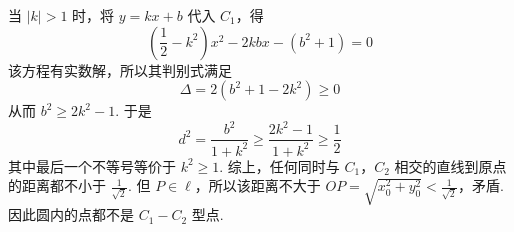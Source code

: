 \begin{problem}
\begin{solution}
\begin{enumerate}
当 \(|k|>1\) 时，将 \(y=kx+b\) 代入 \(C_1\)，得
\[
\left(\frac{1}{2}-k^2\right)x^2-2kbx-(b^2+1)=0
\]
该方程有实数解，所以其判别式满足
\[
\Delta=2\left(b^2+1-2k^2\right)\geqslant0
\]
从而 \(b^2\geqslant2k^2-1\). 于是
\[
d^2=\frac{b^2}{1+k^2}\geqslant\frac{2k^2-1}{1+k^2}\geqslant\frac{1}{2}
\]
其中最后一个不等号等价于 \(k^2\geqslant1\). 综上，任何同时与 \(C_1\)，\(C_2\) 相交的直线到原点的距离都不小于 \(\frac{1}{\sqrt{2}}\). 但 \(P\in\ell\)，所以该距离不大于 \(OP=\sqrt{x_0^2+y_0^2}<\frac{1}{\sqrt{2}}\)，矛盾. 因此圆内的点都不是 \(C_1-C_2\) 型点.
\end{enumerate}
\end{solution}
\end{problem}
